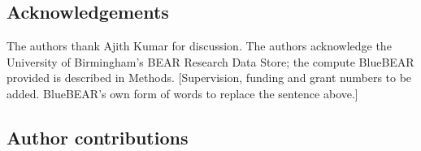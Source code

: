 %

%

\subsection*{Acknowledgements}

The authors thank Ajith Kumar for discussion. The authors acknowledge the
University of Birmingham's BEAR Research Data Store; the compute BlueBEAR
provided is described in Methods. \textcolor{elajcoral}{[Supervision, funding and grant numbers to be
added. BlueBEAR's own form of words to replace the sentence above.]}

\subsection*{Author contributions}


